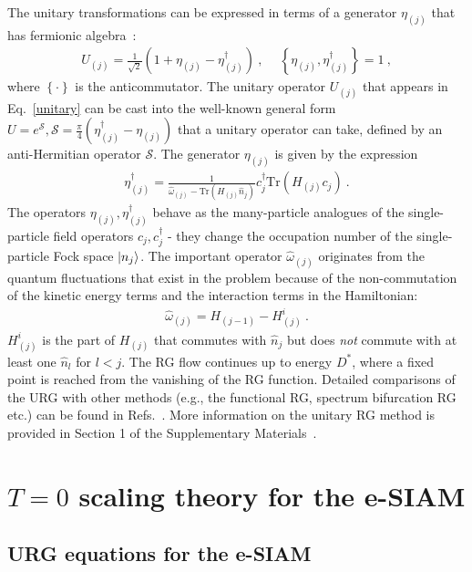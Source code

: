 \documentclass{iopart}
\begin{document}
The unitary transformations can be expressed in terms of a generator \(\eta_{(j)}\) that has fermionic algebra~\cite{anirbanurg1,anirbanurg2}:
\begin{eqnarray}
	\label{unitary}
	U_{(j)} = \frac{1}{\sqrt 2}\left(1 + \eta_{(j)} - \eta_{(j)}^\dagger\right)~,~ \quad\left\{ \eta_{(j)},\eta_{(j)}^\dagger \right\} = 1~,
\end{eqnarray}
where \(\left\{\cdot\right\}\) is the anticommutator. The unitary operator \(U_{(j)}\) that appears in Eq.~\eqref{unitary} can be cast into the well-known general form \(U = e^\mathcal{S}, \mathcal{S} = \frac{\pi}{4}\left( \eta^\dagger_{(j)} - \eta_{(j)} \right)\) that a unitary operator can take, defined by an anti-Hermitian operator \(\mathcal{S}\). The generator \(\eta_{(j)}\) is given by the expression~\cite{anirbanurg1,anirbanurg2}
\begin{eqnarray}
	\eta^\dagger_{(j)} = \frac{1}{\hat \omega_{(j)} - \text{Tr}\left(H_{(j)} \hat n_{j}\right) } c^\dagger_{j} \text{Tr}\left(H_{(j)}c_{j}\right)~.
\end{eqnarray}
The operators \(\eta_{(j)},\eta^\dagger_{(j)}\) behave as the many-particle analogues of the single-particle field operators \(c_j,c^\dagger_j\) - they change the occupation number of the single-particle Fock space \(\ket{n_j}\).  The important operator \(\hat \omega_{(j)}\) originates from the quantum fluctuations that exist in the problem because of the non-commutation of the kinetic energy terms and the interaction terms in the Hamiltonian:
\begin{eqnarray}
	\hat \omega_{(j)} = H_{(j-1)} - H^i_{(j)}~.
	\label{omega}
\end{eqnarray}
\(H^i_{(j)}\) is the part of \(H_{(j)}\) that commutes with \(\hat n_j\) but does {\it not} commute with at least one \(\hat n_l\) for \(l < j\). The RG flow continues up to energy \(D^*\), where a fixed point is reached from the vanishing of the RG function. 
Detailed comparisons of the URG with other methods (e.g., the functional RG, spectrum bifurcation RG etc.) can be found in Refs.~\cite{anirbanmott1,anirbanurg1}. More information on the unitary RG method is provided in Section 1 of the Supplementary Materials~\cite{supp_mat}.

\section{\(T=0\) scaling theory for the e-SIAM}
\label{urg-theory}

\subsection{URG equations for the e-SIAM}
\end{document}
